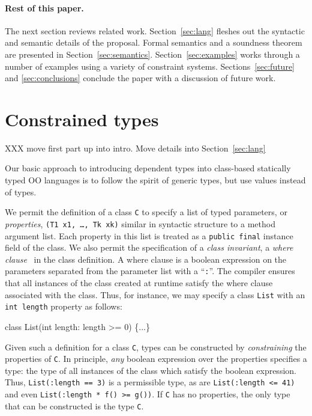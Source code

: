 \documentclass[nocopyrightspace,preprint,9pt]{sigplanconf}
\begin{document}
\paragraph{Rest of this paper.}

The next section reviews related work.
Section~\ref{sec:lang} fleshes out the syntactic and semantic details of the
proposal.
Formal semantics
and a soundness theorem
are presented in Section~\ref{sec:semantics}.
Section~\ref{sec:examples} works through a number of
examples using a variety of constraint systems.
Sections~\ref{sec:future}
and \ref{sec:conclusions} conclude the paper with a discussion of
future work.

\section{Constrained types}

XXX move first part up into intro.  Move details into Section~\ref{sec:lang}

Our basic approach to introducing dependent types into
class-based statically typed OO languages is to
follow the spirit of generic types, but use values instead of
types.

We permit the definition of a class {\tt C} to specify
a list of typed parameters, or {\em properties},
{\tt (T1 x1, \ldots, Tk xk)} similar in syntactic structure to
a method argument list. Each
property in this list is treated as a {\tt public final} instance
field of the class.
We also permit the
specification of a {\em class invariant}, a
{\em where clause}~\cite{where-clauses}
in the class definition. A where
clause is a boolean expression on the parameters separated from the
parameter list with a ``{\tt :}''.  The compiler ensures that all
instances of the class created at runtime satisfy the where clause
associated with the class.
Thus, for instance, we may specify a class {\tt List} with an
{\tt int length} property as follows:
\begin{code}
  class List(int length: length >= 0) \{...\}
\end{code}

Given such a definition for a class {\tt C},
types can be constructed by {\em constraining} the properties of
{\tt C}.
In principle, {\em any} boolean expression over the
properties specifies a type: the type of all instances of the
class which satisfy the boolean expression. Thus,
{\tt List(:length == 3)} is a permissible type, as are
{\tt List(:length <= 41)} and even
{\tt List(:length * f() >= g())}.
If {\tt C} has no properties, the only type that can be
constructed is the type {\tt C}.
\end{document}
